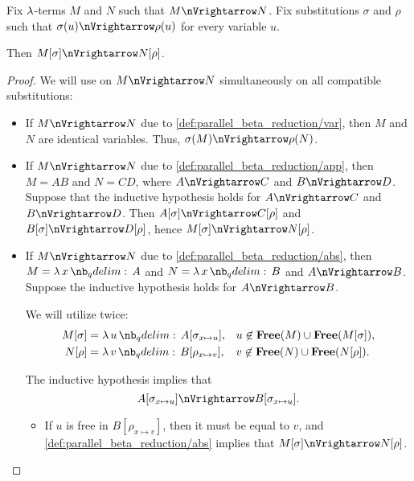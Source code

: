 \begin{lemma}\label{thm:substitution_on_parallel_reduction}
  Fix \( \mathrm{\lambda} \)-terms \( M \) and \( N \) such that \( M \pred N \). Fix substitutions \( \sigma \) and \( \rho \) such that \( \sigma(u) \pred \rho(u) \) for every variable \( u \).

  Then \( M[\sigma] \pred N[\rho] \).
\end{lemma}
\begin{proof}
  We will use  on \( M \pred N \) simultaneously on all compatible substitutions:
  \begin{itemize}
    \item If \( M \pred N \) due to \ref{def:parallel_beta_reduction/var}, then \( M \) and \( N \) are identical variables. Thus, \( \sigma(M) \pred \rho(N) \).

    \item If \( M \pred N \) due to \ref{def:parallel_beta_reduction/app}, then \( M = AB \) and \( N = CD \), where \( A \pred C \) and \( B \pred D \). Suppose that the inductive hypothesis holds for \( A \pred C \) and \( B \pred D \). Then \( A[\sigma] \pred C[\rho] \) and \( B[\sigma] \pred D[\rho] \), hence \( M[\sigma] \pred N[\rho] \).

    \item If \( M \pred N \) due to \ref{def:parallel_beta_reduction/abs}, then \( M = \qabs x A \) and \( N = \qabs x B \) and \( A \pred B \). Suppose the inductive hypothesis holds for \( A \pred B \).

    We will utilize  twice:
    \begin{align*}
      M[\sigma] &= \qabs u A[\sigma_{x \mapsto u}], &&u \not\in \op*{Free}(M) \cup \op*{Free}(M[\sigma]), \\
      N[\rho]   &= \qabs v B[\rho_{x \mapsto v}],   &&v \not\in \op*{Free}(N) \cup \op*{Free}(N[\rho]).
    \end{align*}

    The inductive hypothesis implies that
    \begin{equation*}
      A[\sigma_{x \mapsto u}] \pred B[\sigma_{x \mapsto u}].
    \end{equation*}

    \begin{itemize}
      \item If \( u \) is free in \( B[\rho_{x \mapsto v}] \), then it must be equal to \( v \), and \ref{def:parallel_beta_reduction/abs} implies that \( M[\sigma] \pred N[\rho] \).


\end{itemize}
\end{itemize}
\end{proof}
